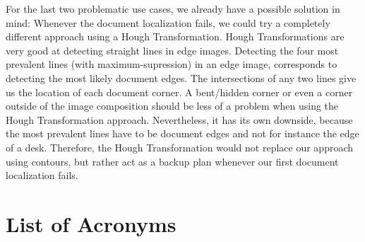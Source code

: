 \documentclass[bibliography=totoc]{scrartcl}
\begin{document}
	For the last two problematic use cases, we already have a possible solution in mind: 
	Whenever the document localization fails, we could try a completely different approach using a Hough Transformation. 
	Hough Transformations are very good at detecting straight lines in edge images. 
	Detecting the four most prevalent lines (with maximum-supression) in an edge image, corresponds to detecting the most likely document edges.
	The intersections of any two lines give us the location of each document corner. 
	A bent/hidden corner or even a corner outside of the image composition should be less of a problem when using the Hough Transformation approach.
	Nevertheless, it has its own downside, because the most prevalent lines have to be document edges and not for instance the edge of a desk.
	Therefore, the Hough Transformation would not replace our approach using contours, but rather act as a backup plan whenever our first document localization fails.


\section*{List of Acronyms} 

\begin{acronym}[....]
\end{acronym}
			

\end{document}
